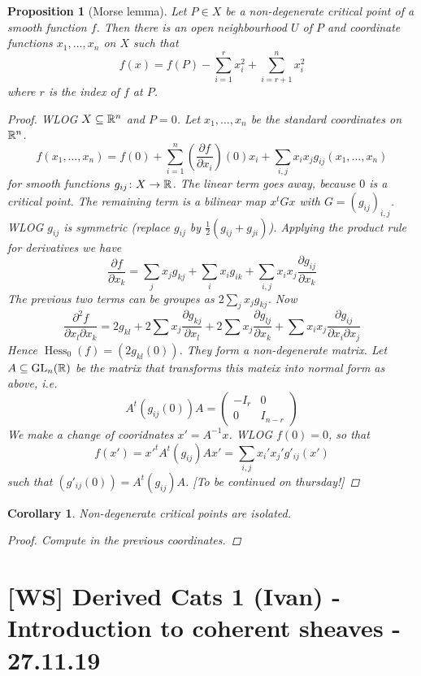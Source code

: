 \documentclass[A4paper, british, reqno]{amsart}
\theoremstyle{darkgreentheorem}
\newtheorem{prop}[thm]{Proposition}
\newtheorem{cor}[thm]{Corollary}
\theoremstyle{darkbluedefinition}
\theoremstyle{darkredexample}
\theoremstyle{remark}
\DeclareMathOperator{\Hess}{Hess}
\newcommand{\1}{\mathbbm{1}}
\newcommand{\sub}{\subseteq}
\begin{document}
\begin{prop}[Morse lemma]
    Let $P\in X$ be a non-degenerate critical point of a smooth function $f$.
    Then there is an open neighbourhood $U$ of $P$ and coordinate functions $x_{1},\ldots,x_{n}$ on $X$ such that
    \[ f(x)=f(P)-\sum_{i=1}^{r}x_{i}^{2}+\sum_{i=r+1}^{n}x_{i}^{2} \]
    where $r$ is the index of $f$ at $P$.
    \begin{proof}
	WLOG $X\sub \R^{n}$ and $P=0$.
	Let $x_{1},\ldots,x_{n}$ be the standard coordinates on $\mathbb{R}^{n}$.
	\[ f(x_{1},\ldots,x_{n})=f(0)+\sum_{i=1}^{n}(\frac{\partial f}{\partial x_{i}})(0)x_{i}+\sum_{i,j}x_{i}x_{j}g_{ij}(x_{1},\ldots,x_{n}) \]
	for smooth functions $g_{ij}\colon X\to \mathbb{R}$.
	The linear term goes away, because $0$ is a critical point.
	The remaining term is a bilinear map $x^{t}Gx$ with $G=(g_{ij})_{i,j}$.
	WLOG $g_{ij}$ is symmetric (replace $g_{ij}$ by $\frac{1}{2}(g_{ij}+g_{ji})$).
	Applying the product rule for derivatives we have
	\[ \frac{\partial f}{\partial x_{k}}=\sum_{j}x_{j}g_{kj}+\sum_{i}x_{i}g_{ik}+\sum_{i,j}x_{i}x_{j}\frac{\partial g_{ij}}{\partial x_{k}} \]
	The previous two terms can be groupes as $2\sum_{j}x_{j}g_{kj}$.
	Now
	\[ \frac{\partial^{2} f}{\partial x_{l}\partial x_{k}}=2g_{kl}+2\sum x_{j}\frac{\partial g_{kj}}{\partial x_{l}} +2\sum x_{j}\frac{\partial g_{lj}}{\partial x_{k}}+\sum x_{i}x_{j}\frac{\partial g_{ij}}{\partial x_{i}\partial x_{j}} \]
	Hence $\Hess_{0}(f)=(2g_{kl}(0))$.
	They form a non-degenerate matrix.
	Let $A\sub \operatorname{GL}_{n}(\R)$ be the matrix that transforms this mateix into normal form as above, i.e.
	\[ A^{t}(g_{ij}(0))A=\begin{pmatrix} -I_{r} & 0 \\ 0 & I_{n-r}\end{pmatrix} \]
	We make a change of cooridnates $x'=A^{-1}x$.
	WLOG $f(0)=0$, so that
	\[ f(x')=x'^{t}A^{t}(g_{ij})Ax'=\sum_{i,j}x_{i}'x_{j}'g'_{ij}(x') \]
	such that $(g'_{ij}(0))=A^{t}(g_{ij})A$.
	[To be continued on thursday!]
    \end{proof}
\end{prop}

\begin{cor}
    Non-degenerate critical points are isolated.
    \begin{proof}
	Compute in the previous coordinates.
    \end{proof}
\end{cor}

\section{[WS] Derived Cats 1 (Ivan) - Introduction to coherent sheaves - 27.11.19}
\end{document}
